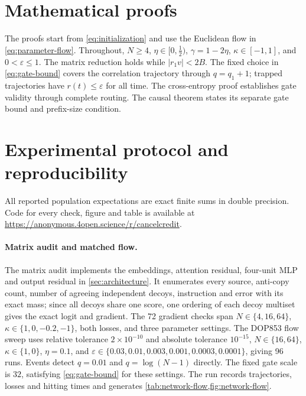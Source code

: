 \section{Mathematical proofs}
\label{app:proofs}
The proofs start from \cref{eq:initialization} and use the Euclidean flow in \cref{eq:parameter-flow}.
Throughout, $N\ge4$, $\eta\in[0,\tfrac{1}{2})$, $\gamma=1-2\eta$, $\kappa\in[-1,1]$, and $0<\varepsilon\le1$.
The matrix reduction holds while $|r_1v|<2B$.
The fixed choice in \cref{eq:gate-bound} covers the correlation trajectory through $q=q_1+1$;
trapped trajectories have $r(t)\le \varepsilon$ for all time.
The cross-entropy proof establishes gate validity through complete routing. The causal theorem states its separate gate bound and prefix-size condition.









\section{Experimental protocol and reproducibility}
\label{app:numerics}
\label{app:repro}
\label{app:network-experiments}
All reported population expectations are exact finite sums in double precision. Code for every check, figure and table is available at
\url{https://anonymous.4open.science/r/cancelcredit}.

\paragraph{Matrix audit and matched flow.}
The matrix audit implements the embeddings, attention residual, four-unit MLP and output residual in \cref{sec:architecture}.
It enumerates every source, anti-copy count, number of agreeing independent decoys, instruction and error with its exact mass;
since all decoys share one score, one ordering of each decoy multiset gives the exact logit and gradient.
The 72 gradient checks span $N\in\{4,16,64\}$, $\kappa\in\{1,0,-0.2,-1\}$, both losses, and three parameter settings.
The DOP853 flow sweep uses relative tolerance $2\times10^{-10}$ and absolute tolerance $10^{-15}$,
$N\in\{16,64\}$, $\kappa\in\{1,0\}$, $\eta=0.1$, and
$\varepsilon\in\{0.03,0.01,0.003,0.001,0.0003,0.0001\}$, giving 96 runs.
Events detect $q=0.01$ and $q=\log(N-1)$ directly.
The fixed gate scale is $32$, satisfying \cref{eq:gate-bound} for these settings.
The run records trajectories, losses and hitting times and generates \cref{tab:network-flow,fig:network-flow}.

